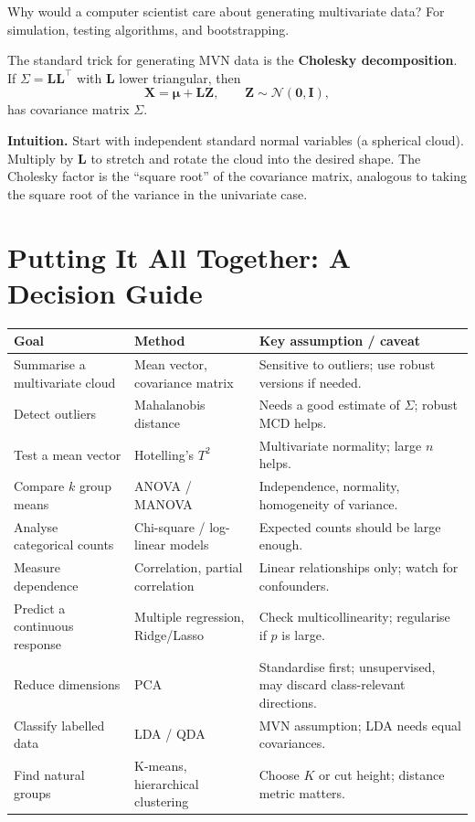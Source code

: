 \documentclass[11pt,a4paper]{article}
\newcommand{\vect}[1]{\mathbf{#1}}
\newcommand{\mat}[1]{\mathbf{#1}}
\begin{document}
Why would a computer scientist care about generating multivariate
data?  For simulation, testing algorithms, and bootstrapping.

The standard trick for generating MVN data is the \textbf{Cholesky
decomposition}.  If $\Sigma = \mat{L}\mat{L}^\top$ with $\mat{L}$
lower triangular, then
\[
\vect{X} = \boldsymbol{\mu} + \mat{L}\vect{Z},
\qquad \vect{Z}\sim\mathcal{N}(\vect{0},\mat{I}),
\]
has covariance matrix $\Sigma$.

\textbf{Intuition.}  Start with independent standard normal variables
(a spherical cloud).  Multiply by $\mat{L}$ to stretch and rotate the
cloud into the desired shape.  The Cholesky factor is the ``square
root'' of the covariance matrix, analogous to taking the square root
of the variance in the univariate case.

\section{Putting It All Together: A Decision Guide}

\begin{center}
\begin{tabular}{@{}p{}p{}p{}@{}}
\toprule
\textbf{Goal} & \textbf{Method} & \textbf{Key assumption / caveat} \\
\midrule
Summarise a multivariate cloud & Mean vector, covariance matrix &
Sensitive to outliers; use robust versions if needed. \\
Detect outliers & Mahalanobis distance &
Needs a good estimate of $\Sigma$; robust MCD helps. \\
Test a mean vector & Hotelling's $T^2$ &
Multivariate normality; large $n$ helps. \\
Compare $k$ group means & ANOVA / MANOVA &
Independence, normality, homogeneity of variance. \\
Analyse categorical counts & Chi-square / log-linear models &
Expected counts should be large enough. \\
Measure dependence & Correlation, partial correlation &
Linear relationships only; watch for confounders. \\
Predict a continuous response & Multiple regression, Ridge/Lasso &
Check multicollinearity; regularise if $p$ is large. \\
Reduce dimensions & PCA &
Standardise first; unsupervised, may discard class-relevant directions. \\
Classify labelled data & LDA / QDA &
MVN assumption; LDA needs equal covariances. \\
Find natural groups & K-means, hierarchical clustering &
Choose $K$ or cut height; distance metric matters. \\
\bottomrule
\end{tabular}
\end{center}
\end{document}
